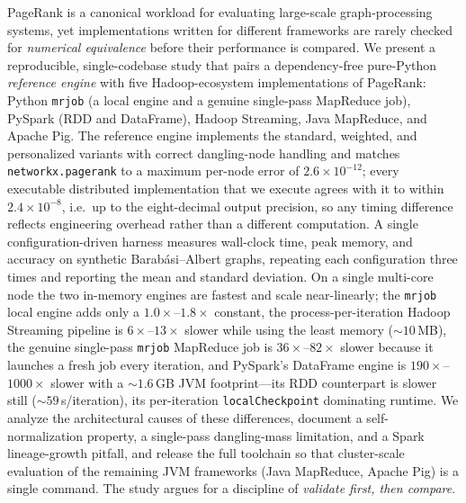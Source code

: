 PageRank is a canonical workload for evaluating large-scale graph-processing
systems, yet implementations written for different frameworks are rarely checked
for \emph{numerical equivalence} before their performance is compared. We present
a reproducible, single-codebase study that pairs a dependency-free pure-Python
\emph{reference engine} with five Hadoop-ecosystem implementations of PageRank:
Python \texttt{mrjob} (a local engine and a genuine single-pass MapReduce job),
PySpark (RDD and DataFrame), Hadoop Streaming, Java MapReduce, and Apache Pig.
The reference engine implements the standard, weighted, and personalized variants
with correct dangling-node handling and matches \texttt{networkx.pagerank} to a
maximum per-node error of $2.6\times10^{-12}$; every executable distributed
implementation that we execute agrees with it to within $2.4\times10^{-8}$, i.e.\
up to the eight-decimal output precision, so any timing difference reflects
engineering overhead rather than a different computation. A single
configuration-driven harness measures wall-clock time, peak memory, and accuracy
on synthetic Barab\'asi--Albert graphs, repeating each configuration three times
and reporting the mean and standard deviation. On a single multi-core node the two
in-memory engines are fastest and scale near-linearly; the \texttt{mrjob} local
engine adds only a $1.0\times$--$1.8\times$ constant, the process-per-iteration
Hadoop Streaming pipeline is $6\times$--$13\times$ slower while using the least
memory ($\sim\!10$\,MB), the genuine single-pass \texttt{mrjob} MapReduce job is
$36\times$--$82\times$ slower because it launches a fresh job every iteration, and
PySpark's DataFrame engine is $190\times$--$1000\times$ slower with a
$\sim\!1.6$\,GB JVM footprint---its RDD counterpart is slower still
($\sim\!59$\,s/iteration), its per-iteration \texttt{localCheckpoint} dominating
runtime. We analyze the architectural causes of these differences, document a
self-normalization property, a single-pass dangling-mass limitation, and a Spark
lineage-growth pitfall, and release the full toolchain so that cluster-scale
evaluation of the remaining JVM frameworks (Java MapReduce, Apache Pig) is a single
command. The study argues for a discipline of \emph{validate first, then compare}.

